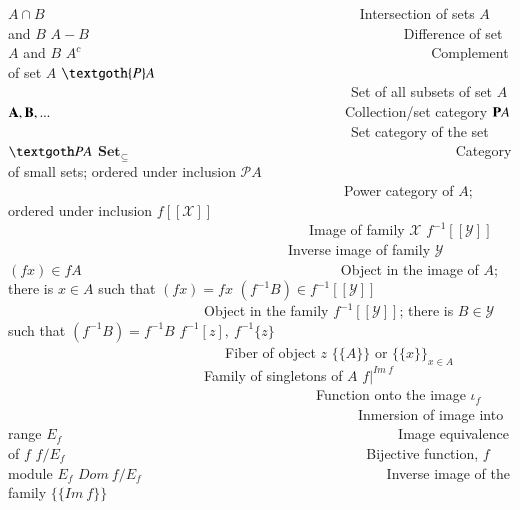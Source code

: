 \documentclass [12pt]{book}
\begin{document}
$A\cap B$~~~~~~~~~~~~~~~~~~~~~~~~~~~~~~~~~~~~~~~~~~~~~Intersection of sets $A$ and $B$\newline
$A-B$~~~~~~~~~~~~~~~~~~~~~~~~~~~~~~~~~~~~~~~~~~~~~Difference of set $A$ and $B$\newline
$A^c$~~~~~~~~~~~~~~~~~~~~~~~~~~~~~~~~~~~~~~~~~~~~~~~~~~Complement of set $A$\newline
$\textgoth{P}A$~~~~~~~~~~~~~~~~~~~~~~~~~~~~~~~~~~~~~~~~~~~~~~~~~Set of all subsets of set $A$\newline
$\textbf A,\textbf B,...$~~~~~~~~~~~~~~~~~~~~~~~~~~~~~~~~~~~~~~~~~~Collection/set category\newline
$\textbf PA$~~~~~~~~~~~~~~~~~~~~~~~~~~~~~~~~~~~~~~~~~~~~~~~~~Set category of the set $\textgoth PA$\newline
$\textbf{Set}_{\subseteq}$~~~~~~~~~~~~~~~~~~~~~~~~~~~~~~~~~~~~~~~~~~~~~~
Category of small sets; ordered under inclusion\newline
$\mathcal PA$~~~~~~~~~~~~~~~~~~~~~~~~~~~~~~~~~~~~~~~~~~~~~~~~Power category of $A$; ordered under inclusion\newline
$f[[\mathcal X]]$~~~~~~~~~~~~~~~~~~~~~~~~~~~~~~~~~~~~~~~~~~~Image of family $\mathcal X$\newline
$f^{-1}[[\mathcal Y]]$~~~~~~~~~~~~~~~~~~~~~~~~~~~~~~~~~~~~~~~~Inverse image of family $\mathcal Y$\newline
$(fx)\in fA$~~~~~~~~~~~~~~~~~~~~~~~~~~~~~~~~~~~~~Object in the image of $A$; there is $x\in A$ such that $(fx)=fx$\newline
$(f^{-1}B)\in f^{-1}[[\mathcal Y]]$~~~~~~~~~~~~~~~~~~~~~~~~~~~~Object in the family $f^{-1}[[\mathcal Y]]$; there is $B\in\mathcal Y$ such that $(f^{-1}B)=f^{-1}B$\newline
$f^{-1}[z],~f^{-1}\{z\}$~~~~~~~~~~~~~~~~~~~~~~~~~~~~~~~Fiber of object $z$\newline
$\{\{A\}\}$ or $\{\{x\}\}_{x\in A}$~~~~~~~~~~~~~~~~~~~~~~~~~~~~Family of singletons of $A$\newline
$f|^{Im~f}$~~~~~~~~~~~~~~~~~~~~~~~~~~~~~~~~~~~~~~~~~~~~Function onto the image\newline
$\iota_f$~~~~~~~~~~~~~~~~~~~~~~~~~~~~~~~~~~~~~~~~~~~~~~~~~~Inmersion of image into range\newline
$E_f$~~~~~~~~~~~~~~~~~~~~~~~~~~~~~~~~~~~~~~~~~~~~~~~~Image equivalence of $f$\newline
$f/E_f$~~~~~~~~~~~~~~~~~~~~~~~~~~~~~~~~~~~~~~~~~~~Bijective function, $f$ module $E_f$\newline
$Dom~f/E_f$~~~~~~~~~~~~~~~~~~~~~~~~~~~~~~~~~~~Inverse image of the family $\{\{Im~f\}\}$\newline
\end{document}
